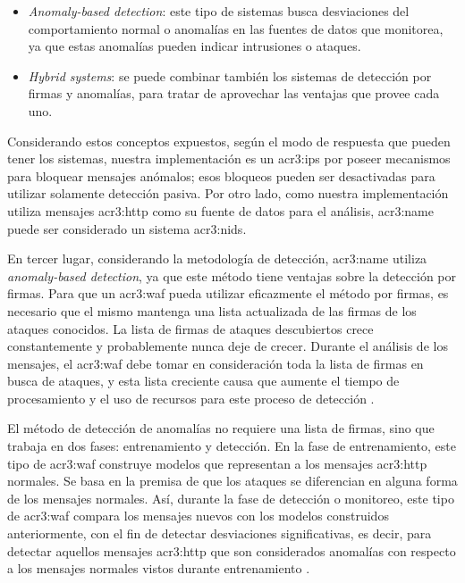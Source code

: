 \begin{itemize}
\begin{itemize}
        \item
        \textit{Anomaly-based detection}:
        este tipo de sistemas busca desviaciones del comportamiento
        normal o anomalías en las fuentes de datos que monitorea, ya
        que estas anomalías pueden indicar intrusiones o ataques.

        \item
        \textit{Hybrid systems}:
        se puede combinar también los sistemas de detección por firmas
        y anomalías, para tratar de aprovechar las ventajas que provee
        cada uno.
    \end{itemize}
\end{itemize}

Considerando estos conceptos expuestos, según el modo de respuesta
que pueden tener los sistemas, nuestra implementación es un \gls{acr3:ips}
por poseer mecanismos para bloquear mensajes anómalos; esos bloqueos
pueden ser desactivadas para utilizar solamente detección pasiva.
Por otro lado, como nuestra implementación utiliza mensajes \gls{acr3:http}
como su fuente de datos para el análisis, \gls{acr3:name} puede ser
considerado un sistema \gls{acr3:nids}.

En tercer lugar, considerando la metodología de detección, \gls{acr3:name}
utiliza \textit{anomaly-based detection}, ya que este método tiene
ventajas sobre la detección por firmas.
Para que un \gls{acr3:waf} pueda utilizar eficazmente el método por
firmas, es necesario que el mismo mantenga una lista actualizada de
las firmas de los ataques conocidos. La lista de firmas de ataques
descubiertos crece constantemente y probablemente nunca deje de crecer.
Durante el análisis de los mensajes, el \gls{acr3:waf} debe tomar en
consideración toda la lista de firmas en busca de ataques, y esta lista
creciente causa que aumente el tiempo de procesamiento y el uso de
recursos para este proceso de detección
\citep{kruegel2003anomaly}. %

El método de detección de anomalías no requiere una lista de firmas,
sino que trabaja en dos fases: entrenamiento y detección. En la fase
de entrenamiento, este tipo de \gls{acr3:waf} construye modelos que
representan a los mensajes \gls{acr3:http} normales. Se basa en la premisa
de que los ataques se diferencian en alguna forma de los mensajes normales.
Así, durante la fase de detección o monitoreo, este tipo de \gls{acr3:waf}
compara los mensajes nuevos con los modelos construidos anteriormente,
con el fin de detectar desviaciones significativas, es decir, para detectar
aquellos mensajes \gls{acr3:http} que son considerados anomalías con
respecto a los mensajes normales vistos durante entrenamiento
\citep{kruegel2003anomaly}. %

